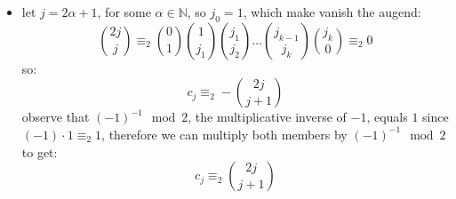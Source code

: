 \begin{itemize}
    \item let $j=2\alpha+1$, for some $\alpha\in\mathbb{N}$, so $j_{0}=1$,
        which make vanish the augend:
        \begin{displaymath}
            {{2j}\choose{j}}
            \equiv_{2} {{0}\choose{1}}{{1}\choose{j_{1}}}{{j_{1}}\choose{j_{2}}}
                \ldots{{j_{k-1}}\choose{j_{k}}}{{j_{k}}\choose{0}}\equiv_{2}0
        \end{displaymath}
        so:
        \begin{displaymath}
            c_{j}\equiv_{2}-{{2j}\choose{j+1}}
        \end{displaymath}
        observe that $(-1)^{-1}\mod2$, the multiplicative inverse of $-1$, equals $1$
        since $(-1)\cdot 1 \equiv_{2}1$, therefore we can multiply both members by
        $(-1)^{-1}\mod2$ to get:
        \begin{displaymath}
            c_{j}\equiv_{2}{{2j}\choose{j+1}}
        \end{displaymath}


\end{itemize}
